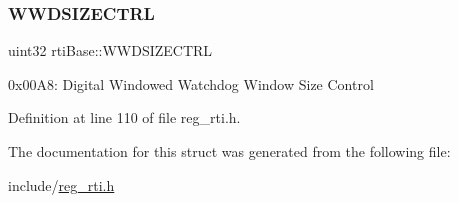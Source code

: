 \subsubsection{\texorpdfstring{W\+W\+D\+S\+I\+Z\+E\+C\+T\+RL}{WWDSIZECTRL}}
{\footnotesize\ttfamily uint32 rti\+Base\+::\+W\+W\+D\+S\+I\+Z\+E\+C\+T\+RL}

0x00\+A8\+: Digital Windowed Watchdog Window Size Control 

Definition at line 110 of file reg\+\_\+rti.\+h.



The documentation for this struct was generated from the following file\+:\begin{DoxyCompactItemize}
\item 
include/\mbox{\hyperlink{reg__rti_8h}{reg\+\_\+rti.\+h}}\end{DoxyCompactItemize}
